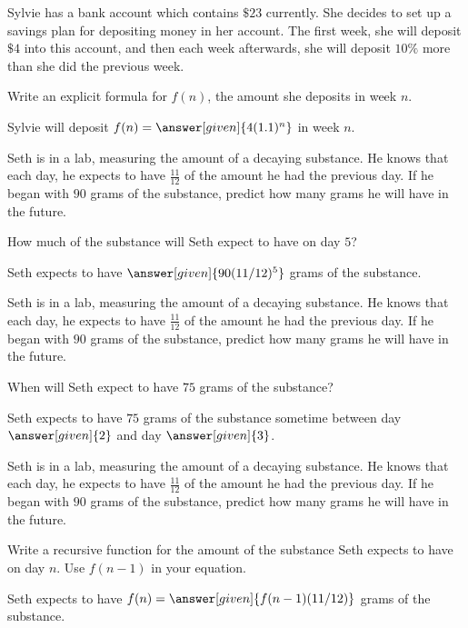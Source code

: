 \documentclass[nooutcomes]{ximera}
\begin{document}
\begin{problem}
Sylvie has a bank account which contains $\$23$ currently.  She decides to set up a savings plan for depositing money in her account.  The first week, she will deposit $\$4$ into this account, and then each week afterwards, she will deposit $10\%$ more than she did the previous week.  

Write an explicit formula for $f(n)$, the amount she deposits in week $n$.

\begin{prompt}
Sylvie will deposit $f(n) = \answer[given]{4(1.1)^n}$ in week $n$.
\end{prompt}

\end{problem}




\begin{problem}
Seth is in a lab, measuring the amount of a decaying substance.  He knows that each day, he expects to have $\frac{11}{12}$ of the amount he had the previous day.  If he began with $90$ grams of the substance, predict how many grams he will have in the future.

How much of the substance will Seth expect to have on day $5$?
\begin{prompt}
Seth expects to have $\answer[given]{90(11/12)^{5}}$ grams of the substance.
\end{prompt}

\end{problem}



\begin{problem}
Seth is in a lab, measuring the amount of a decaying substance.  He knows that each day, he expects to have $\frac{11}{12}$ of the amount he had the previous day.  If he began with $90$ grams of the substance, predict how many grams he will have in the future.

When will Seth expect to have $75$ grams of the substance?
\begin{prompt}
Seth expects to have $75$ grams of the substance sometime between day $\answer[given]{2}$ and day $\answer[given]{3}$.
\end{prompt}

\end{problem}




\begin{problem}
Seth is in a lab, measuring the amount of a decaying substance.  He knows that each day, he expects to have $\frac{11}{12}$ of the amount he had the previous day.  If he began with $90$ grams of the substance, predict how many grams he will have in the future.

Write a recursive function for the amount of the substance Seth expects to have on day $n$.  Use $f(n-1)$ in your equation.
\begin{prompt}
Seth expects to have $f(n) = \answer[given]{f(n-1)(11/12)}$ grams of the substance.
\end{prompt}

\end{problem}
\end{document}
